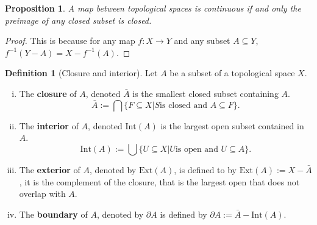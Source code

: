 \documentclass[a4paper,12pt,parskip=half*,chapterprefix=true,numbers=noendperiod]{scrreprt}
\newtheorem{proposition}{Proposition}[section]
\theoremstyle{definition}
\newtheorem{definition}{Definition}[section]
\theoremstyle{remark}
\begin{document}
\begin{proposition}
	A map between topological spaces is continuous if and only the preimage of any closed subset is closed.
\end{proposition}
\begin{proof}
	This is because for any map $f:X\to Y$ and any subset $A\subseteq Y$, $f^{-1}(Y-A)=X-f^{-1}(A)$.
\end{proof}

\begin{definition}[Closure and interior]
	Let $A$ be a subset of a topological space $X$.
	\begin{enumerate}[(i)]
		\item The \textbf{closure} of $A$, denoted $\bar{A}$ is the smallest closed subset containing $A$.
		\begin{equation*}
			\bar{A}:=\bigcap\{F\subseteq X|S\text{is closed and }A\subseteq F\}.
		\end{equation*}
		\item The \textbf{interior} of $A$, denoted $\text{Int}(A)$ is the largest open subset contained in $A$.
		\begin{equation*}
			\text{Int}(A):=\bigcup\{U\subseteq X|U\text{is open and }U\subseteq A\}.
		\end{equation*}
		\item The \textbf{exterior} of $A$, denoted by $\text{Ext}(A)$, is defined to by $\text{Ext}(A):=X-\bar{A}$, it is the complement of the closure, that is the largest open that does not overlap with $A$.
		\item The \textbf{boundary} of $A$, denoted by $\partial A$ is defined by $\partial A:=\bar{A}-\text{Int}(A)$.
	\end{enumerate}
\end{definition}
\end{document}
